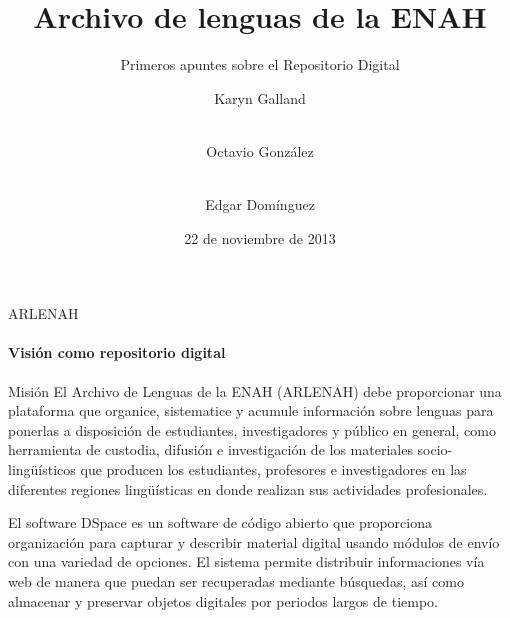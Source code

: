 \documentclass[10pt]{beamer}
\begin{document}
\title{Archivo de lenguas de la ENAH}
\subtitle{Primeros apuntes sobre el Repositorio Digital}
\author{Karyn Galland \and \\
  Octavio González \and \\
  Edgar Domínguez}
\date{22 de noviembre de 2013}

\begin{frame}[plain] 
  \titlepage
\end{frame}

\begin{frame}{ARLENAH}
  \framesubtitle{Visión como repositorio digital}
  
  \begin{block}{Misión}
    El Archivo  de Lenguas  de la ENAH  (ARLENAH) debe proporcionar  una plataforma  que organice,
    sistematice y  acumule información sobre lenguas  para ponerlas a disposición  de estudiantes,
    investigadores y público en general, como herramienta de custodia, difusión e investigación de
    los materiales socio-lingüísticos que producen los estudiantes, profesores e investigadores en
    las diferentes regiones lingüísticas en donde realizan sus actividades profesionales.    
  \end{block}


  \begin{block}{El software}
    DSpace es un software  de código abierto que proporciona organización  para capturar y describir
    material digital  usando módulos  de envío  con una  variedad de  opciones.  El  sistema permite
    distribuir informaciones  vía web de manera  que puedan ser recuperadas  mediante búsquedas, así
    como almacenar y preservar objetos digitales por periodos largos de tiempo.
  \end{block}  

\end{frame}
\end{document}
